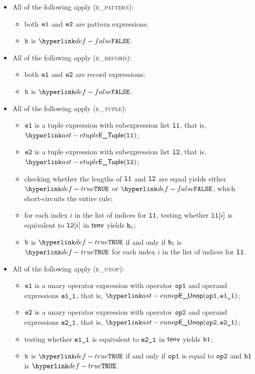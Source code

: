 \begin{itemize}
  \item All of the following apply (\textsc{e\_pattern}):
  \begin{itemize}
    \item both $\texttt{e1}$ and $\texttt{e2}$ are pattern expressions;
    \item $\texttt{b}$ is $\False$.
  \end{itemize}

  \item All of the following apply (\textsc{e\_record}):
  \begin{itemize}
    \item both $\texttt{e1}$ and $\texttt{e2}$ are record expressions;
    \item $\texttt{b}$ is $\False$.
  \end{itemize}

  \item All of the following apply (\textsc{e\_tuple}):
  \begin{itemize}
    \item $\texttt{e1}$ is a tuple expression with subexpression list $\texttt{l1}$,
          that is, $\ETuple(\vlone)$;
    \item $\texttt{e2}$ is a tuple expression with subexpression list $\texttt{l2}$,
          that is, $\ETuple(\vltwo)$;
    \item checking whether the lengths of $\texttt{l1}$ and $\texttt{l2}$ are equal yields either $\True$ or $\False$, which short-circuits
          the entire rule;
    \item for each index $i$ in the list of indices for $\texttt{l1}$, testing whether $\texttt{l1}[i]$ is equivalent to $\texttt{l2}[i]$
          in $\textsf{tenv}$ yields $\texttt{b}_i$\ProseOrTypeError;
    \item $\texttt{b}$ is $\True$ if and only if $\texttt{b}_i$ is $\True$ for each index $i$ in the list of indices for $\texttt{l1}$.
  \end{itemize}

  \item All of the following apply (\textsc{e\_unop}):
  \begin{itemize}
    \item $\texttt{e1}$ is a unary operator expression with operator $\texttt{op1}$ and operand expressions $\texttt{e1\_1}$,
          that is, $\EUnop(\opone, \veoneone)$;
    \item $\texttt{e2}$ is a unary operator expression with operator $\texttt{op2}$ and operand expressions $\texttt{e2\_1}$,
          that is, $\EUnop(\optwo, \vetwoone)$;
    \item testing whether $\texttt{e1\_1}$ is equivalent to $\texttt{e2\_1}$ in $\textsf{tenv}$ yields $\texttt{b1}$;
    \item $\texttt{b}$ is $\True$ if and only if $\texttt{op1}$ is equal to $\texttt{op2}$ and $\texttt{b1}$ is $\True$.
  \end{itemize}


\end{itemize}
